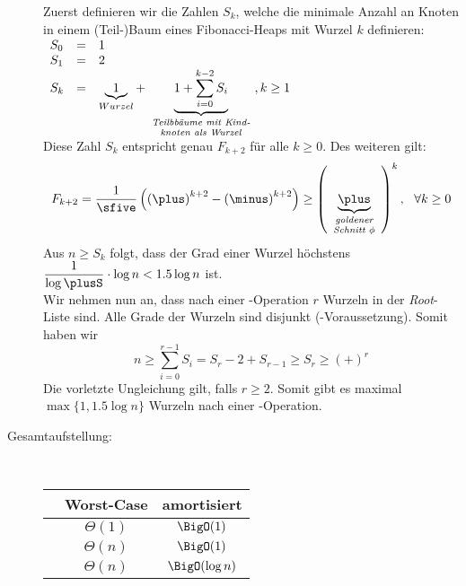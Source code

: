 \begin{description}
	\item[]\Proof
		Zuerst definieren wir die Zahlen $S_k$, welche die minimale Anzahl an Knoten in einem (Teil-)Baum eines Fibonacci-Heaps mit Wurzel  $k$ definieren:\\
		$\begin{array}{lll}
			S_0 & = & 1\\
			S_1 & = & 2\\
			S_k & = & \underbrace{1}_{Wurzel}+\underbrace{1+\sum\limits_{i=0}^{k-2}S_i}_{\begin{minipage}{3cm}
			\scriptsize\centering \textit{Teilbbäume~mit~Kindknoten~als~Wurzel}
			\end{minipage}},k\geq 1
		\end{array}$\\
		Diese Zahl $S_k$ entspricht genau $F_{k+2}$ für alle $k\geq 0$. Des weiteren gilt:
		\[F_{k+2} = \dfrac{1}{\sfive}\left(
			\left(\plus\right)^{k+2}-\left(\minus\right)^{k+2}
		\right) \geq \left(\underbrace{\plus}_{\begin{minipage}{1.5cm}
		\scriptsize\centering\textit{goldener\\Schnitt $\phi$}\end{minipage}}\right)^k,~~\forall k\geq 0\]
		Aus $n\geq S_k$ folgt, dass der Grad einer Wurzel höchstens $\dfrac{1}{\log \plusS}\cdot \log n <1.5\log n$ ist.\\
		Wir nehmen nun an, dass nach einer \cons-Operation $r$ Wurzeln in der \textit{Root}-Liste sind. Alle Grade der Wurzeln sind disjunkt (\cons-Voraussetzung). Somit haben wir
		\[n \geq \sum\limits_{i=0}^{r-1}S_i = S_r-2 + S_{r-1}\geq S_r \geq \left(\plus\right)^r\]
		Die vorletzte Ungleichung gilt, falls $r \geq 2$. Somit gibt es maximal $\max\{1,1.5\log n\}$ Wurzeln nach einer \cons-Operation.
	\item[Gesamtaufstellung:] \ \\\up
		\begin{tabular}{c||c|c}
			& Worst-Case & amortisiert\\\hline
			\insert & $\Theta(1)$ & $\BigO(1)$\\\hline
			\decKey & $\Theta(n)$ & $\BigO(1)$\\\hline
			\exMin & $\Theta(n)$ & $\BigO(\log n)$
		\end{tabular}
\end{description}